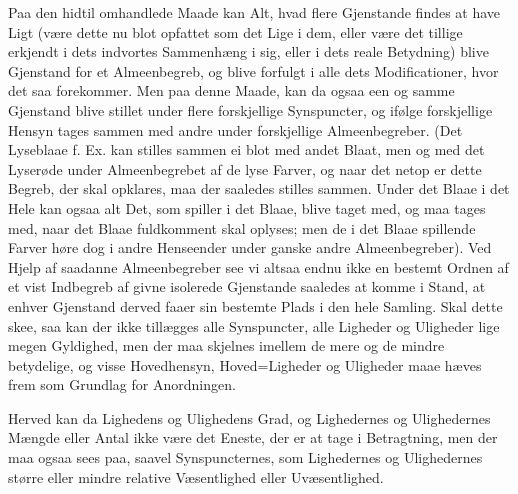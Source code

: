 \documentclass[12pt]{book}
\def\textit#1{#1}%
\def\emph#1{#1}%
\newcommand{\opage}[1]{\marginnote{\footnotesize\textit{[#1]}}}
\begin{document}
Paa den hidtil omhandlede Maade kan Alt, hvad flere Gjenstande findes at have
Ligt (være dette nu blot opfattet som det Lige i dem, eller være det tillige
erkjendt i dets indvortes Sammenhæng i sig, eller i dets reale Betydning) blive
Gjenstand for et Almeenbegreb, og blive forfulgt i alle dets Modificationer, hvor
det saa forekommer. Men paa denne Maade, kan da ogsaa een og samme Gjenstand
blive stillet under flere forskjellige Synspuncter, og ifølge forskjellige Hensyn
tages sammen med andre under forskjellige Almeenbegreber. (Det Lyseblaae f. Ex.
kan stilles sammen ei blot med andet Blaat, men og med det Lyserøde under
Almeenbegrebet af de lyse Farver, og naar det netop er dette
\opage{195} Begreb, der skal opklares, maa der saaledes stilles sammen. Under det Blaae i det
Hele kan ogsaa alt Det, som spiller i det Blaae, blive taget med, og maa tages
med, naar det Blaae fuldkomment skal oplyses; men de i det Blaae spillende Farver
høre dog i andre Henseender under ganske andre Almeenbegreber). Ved Hjelp af
saadanne Almeenbegreber see vi altsaa endnu ikke en bestemt Ordnen af et vist
Indbegreb af givne isolerede Gjenstande saaledes at komme i Stand, at enhver
Gjenstand derved faaer sin bestemte Plads i den hele Samling. Skal dette skee,
saa kan der ikke tillægges alle Synspuncter, alle Ligheder og Uligheder lige
megen Gyldighed, men der maa skjelnes imellem de mere og de mindre betydelige, og
visse \emph{Hovedhensyn, Hoved=Ligheder og Uligheder maae hæves frem som Grundlag
for Anordningen}.

Herved kan da Lighedens og Ulighedens Grad, og Lighedernes og Ulighedernes
\emph{Mængde} eller Antal ikke være det Eneste, der er at tage i Betragtning, men
der maa ogsaa sees paa, saavel Synspuncternes, som Lighedernes og Ulighedernes
større eller mindre relative \emph{Væsentlighed eller Uvæsentlighed}.
\end{document}
